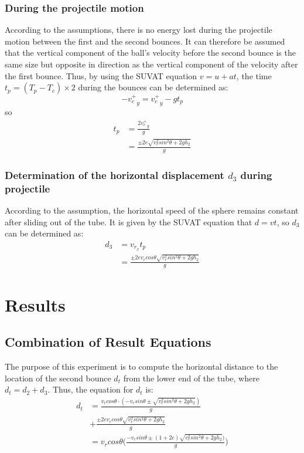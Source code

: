 \documentclass[conference]{IEEEtran}
\begin{document}
        \subsubsection{During the projectile motion}
        According to the assumptions, there is no energy lost during the projectile motion between the first and the second bounces. It can therefore be assumed that the vertical component of the ball's velocity before the second bounce is the same size but opposite in direction as the vertical component of the velocity after the first bounce. Thus, by using the SUVAT equation $v = u + at$, the time $t_p = (T_p - T_c)\times2 $ during the bounces can be determined as:
        $$-{v^+_c}_y = {v^+_c}_y - gt_p$$
        so 
        \begin{equation}
            \begin{aligned}
                t_p &= \frac{2{v^+_c}_y}{g}\\
                    &= \frac{\pm2e\sqrt{{v^2_{r}sin^2\theta}+2gh_2}}{g}
            \end{aligned}
        \end{equation}
        \subsubsection{Determination of the horizontal displacement $d_3$ during projectile}
        According to the assumption, the horizontal speed of the sphere remains constant after sliding out of the tube. It is given by the SUVAT equation that $d = vt$, so $d_3$ can be determined as:
        \begin{equation}
            \begin{aligned}
                d_3 &= v_{r_x}t_p\\
                &=  \frac{\pm2ev_rcos\theta\sqrt{{v^2_{r}sin^2\theta}+2gh_2}}{g}
            \end{aligned}
        \end{equation}
    \section{Results}
        \subsection{Combination of Result Equations}
            The purpose of this experiment is to compute the horizontal distance to the location of the second bounce $d_t$ from the lower end of the tube, where $d_t = d_2 + d_3$. Thus, the equation for $d_t$ is:
            \begin{equation}\label{d_t}
                \begin{aligned}
                    d_t &= \frac{v_rcos\theta \cdot (-v_{r}sin\theta\pm\sqrt{{v^2_{r}sin^2\theta}+2gh_2})}{g}\\&+\frac{\pm2ev_rcos\theta\sqrt{{v^2_{r}sin^2\theta}+2gh_2}}{g} \\
                    &= v_rcos\theta \Big(\frac{-v_rsin\theta\pm(1+2e)\sqrt{{v^2_{r}sin^2\theta}+2gh_2})}{g}\Big)
                \end{aligned}
            \end{equation}
\end{document}
